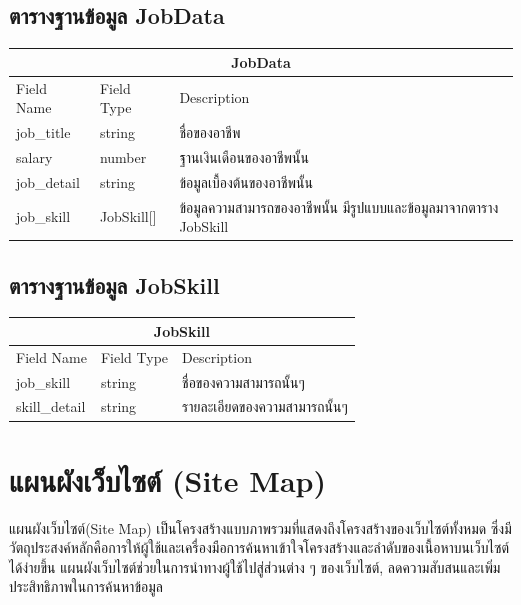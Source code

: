 \subsection{ตารางฐานข้อมูล JobData}
\begin{table}[H]
    \begin{tabular*}{\textwidth}{l|l|p{}}
        \hline
        \multicolumn{3}{c}{JobData}                                                                      \\\hline
        Field Name  & Field Type     & Description                                                       \\\hline
        job\_title  & string         & ชื่อของอาชีพ                                                      \\
        salary      & number         & ฐานเงินเดือนของอาชีพนั้น                                          \\
        job\_detail & string         & ข้อมูลเบื้องต้นของอาชีพนั้น                                       \\
        job\_skill  & JobSkill{[}{]} & ข้อมูลความสามารถของอาชีพนั้น มีรูปแบบและข้อมูลมาจากตาราง JobSkill \\ \hline
    \end{tabular*}
\end{table}

\subsection{ตารางฐานข้อมูล JobSkill}
\begin{table}[H]
    \begin{tabular*}{\textwidth}{l|l|p{}}
        \hline
        \multicolumn{3}{c}{JobSkill}                              \\\hline
        Field Name    & Field Type & Description                  \\\hline
        job\_skill    & string     & ชื่อของความสามารถนั้นๆ       \\
        skill\_detail & string     & รายละเอียดของความสามารถนั้นๆ \\\hline
    \end{tabular*}
\end{table}


\section{แผนผังเว็บไซต์ (Site Map)}
แผนผังเว็บไซต์(Site Map) เป็นโครงสร้างแบบภาพรวมที่แสดงถึงโครงสร้างของเว็บไซต์ทั้งหมด ซึ่งมีวัตถุประสงค์หลักคือการให้ผู้ใช้และเครื่องมือการค้นหาเข้าใจโครงสร้างและลำดับของเนื้อหาบนเว็บไซต์ได้ง่ายขึ้น แผนผังเว็บไซต์ช่วยในการนำทางผู้ใช้ไปสู่ส่วนต่าง ๆ ของเว็บไซต์, ลดความสับสนและเพิ่มประสิทธิภาพในการค้นหาข้อมูล

